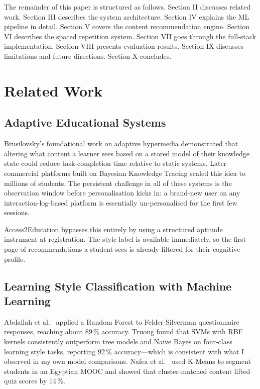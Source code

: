 \documentclass[12pt,a4paper]{article}
\begin{document}
The remainder of this paper is structured as follows. Section II
discusses related work. Section III describes the system architecture.
Section IV explains the ML pipeline in detail. Section V covers the
content recommendation engine. Section VI describes the spaced
repetition system. Section VII goes through the full-stack
implementation. Section VIII presents evaluation results. Section IX
discusses limitations and future directions. Section X concludes.

\section{Related Work}

\subsection{Adaptive Educational Systems}

Brusilovsky's foundational work on adaptive hypermedia
\cite{brusilovsky1996} demonstrated that altering what content a
learner sees based on a stored model of their knowledge state could
reduce task-completion time relative to static systems. Later
commercial platforms built on Bayesian Knowledge Tracing
\cite{corbett1994} scaled this idea to millions of students.
The persistent challenge in all of these systems is the observation
window before personalisation kicks in: a brand-new user on any
interaction-log-based platform is essentially un-personalised for
the first few sessions.

Access2Education bypasses this entirely by using a structured
aptitude instrument at registration. The style label is available
immediately, so the first page of recommendations a student sees is
already filtered for their cognitive profile.

\subsection{Learning Style Classification with Machine Learning}

Abdallah et al.\ \cite{abdallah2020} applied a Random Forest to
Felder-Silverman questionnaire responses, reaching about 89\,\%
accuracy. Truong \cite{truong2016} found that SVMs with RBF kernels
consistently outperform tree models and Naive Bayes on four-class
learning style tasks, reporting 92\,\% accuracy---which is consistent
with what I observed in my own model comparisons. Nafea et al.\
\cite{nafea2021} used K-Means to segment students in an Egyptian MOOC
and showed that cluster-matched content lifted quiz scores by 14\,\%.
\end{document}
